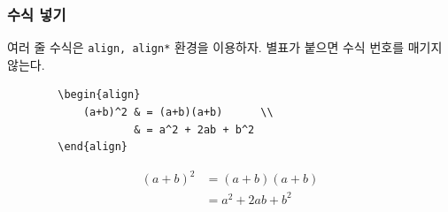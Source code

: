 \documentclass[aspectratio={169}]{beamer}
\begin{document}
\begin{frame}[fragile]
    \frametitle{수식 넣기}

    여러 줄 수식은 \texttt{align, align*} 환경을 이용하자. 별표가 붙으면 수식 번호를 매기지 않는다.

    \begin{verbatim}
        \begin{align}
            (a+b)^2 & = (a+b)(a+b)      \\
                    & = a^2 + 2ab + b^2
        \end{align}
    \end{verbatim}
    \begin{align}
        (a+b)^2 & = (a+b)(a+b)      \\
                & = a^2 + 2ab + b^2
    \end{align}

\end{frame}
\end{document}
